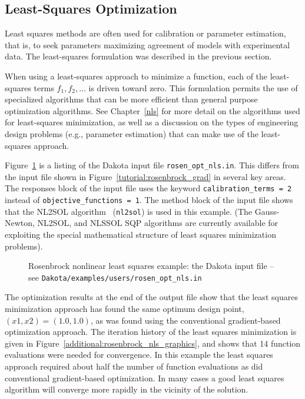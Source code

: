 \subsection{Least-Squares Optimization}\label{additional:rosenbrock:examples:nonlinear}

Least squares methods are often used for calibration or parameter
estimation, that is, to seek parameters maximizing agreement of models
with experimental data. The least-squares formulation was described in 
the previous section.

When using a least-squares approach to minimize a function, each of the
least-squares terms $f_1, f_2,\ldots$ is driven toward zero. This
formulation permits the use of specialized algorithms that can be more
efficient than general purpose optimization algorithms. See
Chapter~\ref{nls} for more detail on the algorithms used for least-squares
minimization, as well as a discussion on the types of
engineering design problems (e.g., parameter estimation) that can make
use of the least-squares approach.

Figure~\ref{additional:rosenbrock_nls} is a listing of the Dakota input
file \texttt{rosen\_opt\_nls.in}. This differs from the input
file shown in Figure~\ref{tutorial:rosenbrock_grad} in several key
areas. The responses block of the input file uses the keyword
\texttt{calibration\_terms = 2} instead of
\texttt{objective\_functions = 1}.
The method block of the input file shows that the NL2SOL
algorithm~\cite{Den81} (\texttt{nl2sol}) is used in this example. (The
Gauss-Newton, NL2SOL, and NLSSOL SQP algorithms are currently
available for exploiting the special mathematical structure of least
squares minimization problems).

\begin{figure}[ht!]
  \centering
  \begin{bigbox}
    \begin{small}
    \end{small}
  \end{bigbox}
  \caption{Rosenbrock nonlinear least squares example: the Dakota input file --
see \texttt{Dakota/examples/users/rosen\_opt\_nls.in} }
  \label{additional:rosenbrock_nls}
\end{figure}

The optimization results at the end of the output file show that the least
squares minimization approach has found the same optimum design point,
$(x1,x2) = (1.0,1.0)$, as was found using the conventional
gradient-based optimization approach. The iteration history of the
least squares minimization is given in
Figure~\ref{additional:rosenbrock_nls_graphics}, and shows that 14
function evaluations were needed for convergence. In this example the
least squares approach required about half the number of function
evaluations as did conventional gradient-based optimization.
In many cases a good least squares algorithm will converge more rapidly
in the vicinity of the solution.

